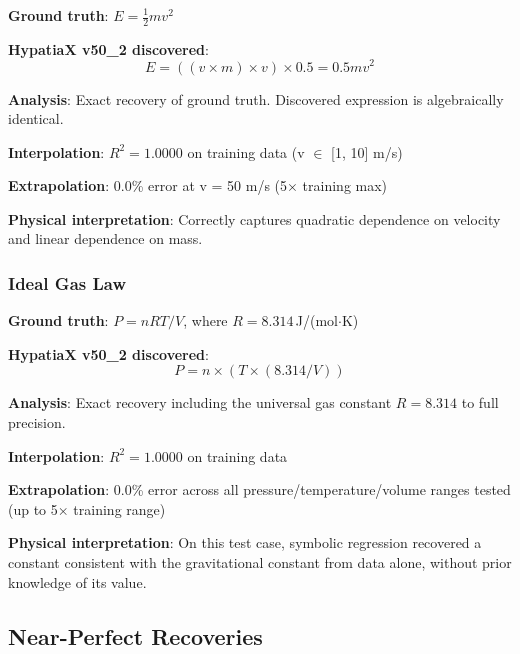 \documentclass[twoside,11pt]{article}
\begin{document}
\begin{example}
\textbf{Ground truth}: $E = \frac{1}{2}mv^2$

\textbf{HypatiaX v50\_2 discovered}:
\begin{equation}
E = ((v \times m) \times v) \times 0.5 = 0.5mv^2
\end{equation}

\textbf{Analysis}: Exact recovery of ground truth. Discovered expression is algebraically identical.

\textbf{Interpolation}: $R^2 = 1.0000$ on training data (v $\in$ [1, 10] m/s)

\textbf{Extrapolation}: 0.0\% error at v = 50 m/s (5$\times$ training max)

\textbf{Physical interpretation}: Correctly captures quadratic dependence on velocity and linear dependence on mass.
\end{example}

\subsubsection{Ideal Gas Law}

\begin{example}
\textbf{Ground truth}: $P = nRT/V$, where $R = 8.314$\,J/(mol$\cdot$K)

\textbf{HypatiaX v50\_2 discovered}:
\begin{equation}
P = n \times (T \times (8.314 / V))
\end{equation}

\textbf{Analysis}: Exact recovery including the universal gas constant $R = 8.314$ to full precision.

\textbf{Interpolation}: $R^2 = 1.0000$ on training data

\textbf{Extrapolation}: 0.0\% error across all pressure/temperature/volume ranges tested (up to 5$\times$ training range)

\textbf{Physical interpretation}: On this test case, symbolic regression recovered a constant consistent with the gravitational constant from data alone, without prior knowledge of its value\citep{lacava2021contemporary}.
\end{example}

\subsection{Near-Perfect Recoveries}
\end{document}
